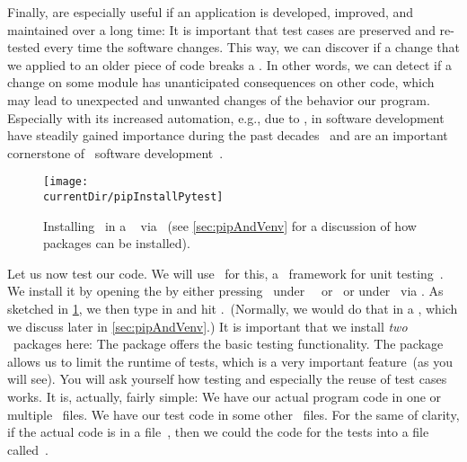 Finally,  are especially useful if an application is developed, improved, and maintained over a long time:
It is important that test cases are preserved and re-tested every time the software changes.
This way, we can discover if a change that we applied to an older piece of code breaks a .
In other words, we can detect if a change on some module has unanticipated consequences on other code, which may lead to unexpected and unwanted changes of the behavior our program.
Especially with its increased automation, e.g., due to ,  in software development have steadily gained importance during the past decades~\cite{W2000WISTAWIISH,TLG2006UTCU,R2006ASOUTP} and are an important cornerstone of \python\ software development~\cite{P2021PUTAAOAEUTIP,O2022PTWP,DG2020TIP}.%
%
%
\begin{figure}%
\centering%
\texttt{[image: \\currentDir/pipInstallPytest]}%
\caption{Installing \pytest\ in a \ubuntu\  via \pip~(see \cref{sec:pipAndVenv} for a discussion of how packages can be installed).}%
\label{fig:pipInstallPytest}%
\end{figure}%
%
Let us now test our code.
We will use \pytest\ for this, a \python\ framework for unit testing~\cite{KPDT2024PD}.
We install it by opening the  by either pressing \ubuntuTerminal\ under \ubuntu\ \linux\ or \ubuntuTerminal\ or under \microsoftWindows\ via \windowsTerminal.
As sketched in \cref{fig:pipInstallPytest}, we then type in  and hit \keys{\enter}.~(Normally, we would do that in a , which we discuss later in \cref{sec:pipAndVenv}.)
It is important that we install \emph{two} \python\ packages here:
The package  offers the basic testing functionality.
The package  allows us to limit the runtime of tests, which is a very important feature~(as you will see).%
%
%
%
You will ask yourself how testing and especially the reuse of test cases works.
It is, actually, fairly simple:
We have our actual program code in one or multiple \python\ files.
We have our test code in some other \python\ files.
For the same of clarity, if the actual code is in a file~, then we could the code for the tests into a file called~.


